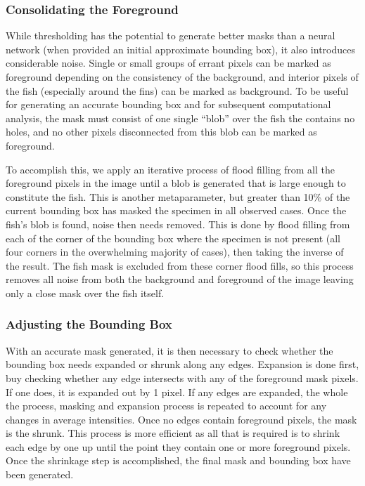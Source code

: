 \documentclass[screen,review]{acmart}
\begin{document}
\subsubsection{Consolidating the Foreground}
While thresholding has the potential to generate better masks than a neural network (when provided an initial approximate bounding box), it also introduces considerable noise. Single or small groups of errant pixels can be marked as foreground depending on the consistency of the background, and interior pixels of the fish (especially around the fins) can be marked as background. To be useful for generating an accurate bounding box and for subsequent computational analysis, the mask must consist of one single ``blob'' over the fish the contains no holes, and no other pixels disconnected from this blob can be marked as foreground.

To accomplish this, we apply an iterative process of flood filling from all the foreground pixels in the image until a blob is generated that is large enough to constitute the fish. This is another metaparameter, but greater than 10\% of the current bounding box has masked the specimen in all observed cases. Once the fish's blob is found, noise then needs removed. This is done by flood filling from each of the corner of the bounding box where the specimen is not present (all four corners in the overwhelming majority of cases), then taking the inverse of the result. The fish mask is excluded from these corner flood fills, so this process removes all noise from both the background and foreground of the image leaving only a close mask over the fish itself.

\subsubsection{Adjusting the Bounding Box}
With an accurate mask generated, it is then necessary to check whether the bounding box needs expanded or shrunk along any edges. Expansion is done first, buy checking whether any edge intersects with any of the foreground mask pixels. If one does, it is expanded out by 1 pixel. If any edges are expanded, the whole the process, masking and expansion process is repeated to account for any changes in average intensities. Once no edges contain foreground pixels, the mask is the shrunk. This process is more efficient as all that is required is to shrink each edge by one up until the point they contain one or more foreground pixels. Once the shrinkage step is accomplished, the final mask and bounding box have been generated.
\end{document}

